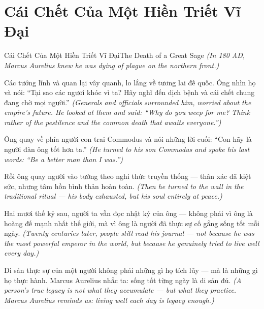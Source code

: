 \section{Cái Chết Của Một Hiền Triết Vĩ Đại}
\begin{truyen}{Cái Chết Của Một Hiền Triết Vĩ Đại}{The Death of a Great Sage}
\textit{(In 180 AD, Marcus Aurelius knew he was dying of plague on the northern front.)}

Các tướng lĩnh và quan lại vây quanh, lo lắng về tương lai đế quốc. Ông nhìn họ và nói: ``Tại sao các ngươi khóc vì ta? Hãy nghĩ đến dịch bệnh và cái chết chung đang chờ mọi người.''
\textit{(Generals and officials surrounded him, worried about the empire's future. He looked at them and said: ``Why do you weep for me? Think rather of the pestilence and the common death that awaits everyone.'')}

Ông quay về phía người con trai Commodus và nói những lời cuối: ``Con hãy là người đàn ông tốt hơn ta.''
\textit{(He turned to his son Commodus and spoke his last words: ``Be a better man than I was.'')}

Rồi ông quay người vào tường theo nghi thức truyền thống — thân xác đã kiệt sức, nhưng tâm hồn bình thản hoàn toàn.
\textit{(Then he turned to the wall in the traditional ritual — his body exhausted, but his soul entirely at peace.)}

Hai mươi thế kỷ sau, người ta vẫn đọc nhật ký của ông — không phải vì ông là hoàng đế mạnh nhất thế giới, mà vì ông là người đã thực sự cố gắng sống tốt mỗi ngày.
\textit{(Twenty centuries later, people still read his journal — not because he was the most powerful emperor in the world, but because he genuinely tried to live well every day.)}

\end{truyen}

\begin{baihoc}
Di sản thực sự của một người không phải những gì họ tích lũy — mà là những gì họ thực hành. Marcus Aurelius nhắc ta: sống tốt từng ngày là di sản đủ.
\textit{(A person's true legacy is not what they accumulate — but what they practice. Marcus Aurelius reminds us: living well each day is legacy enough.)}
\end{baihoc}
